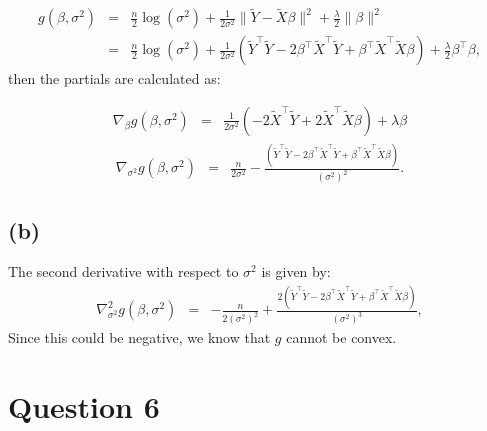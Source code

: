 \documentclass{article}\usepackage[]{graphicx}\usepackage[]{color}
\begin{document}
\begin{eqnarray*}
  g(\beta,\sigma^2) &=& \frac{n}{2}\log(\sigma^2) + \frac{1}{2\sigma^2}\|\tilde{Y}-\tilde{X}\beta\|^2 + \frac{\lambda}{2}\|\beta\|^2 \\
        &=& \frac{n}{2}\log(\sigma^2) + \frac{1}{2\sigma^2}(\tilde{Y}^\top\tilde{Y}-2\beta^\top\tilde{X}^\top\tilde{Y} + \beta^\top\tilde{X}^\top\tilde{X}\beta) + \frac{\lambda}{2}\beta^\top\beta,
\end{eqnarray*}
then the partials are calculated as:

\begin{eqnarray*}
  \nabla_\beta g(\beta,\sigma^2) &=& \frac{1}{2\sigma^2}\left( -2\tilde{X}^\top\tilde{Y} + 2\tilde{X}^\top\tilde{X}\beta \right) + \lambda\beta
\end{eqnarray*}
\begin{eqnarray*}
  \nabla_{\sigma^2} g(\beta,\sigma^2) &=& \frac{n}{2\sigma^2} - \frac{(\tilde{Y}^\top\tilde{Y} - 2\beta^\top\tilde{X}^\top\tilde{Y} + \beta^\top\tilde{X}^\top\tilde{X}\beta)}{(\sigma^2)^2}.
\end{eqnarray*}

\subsection*{(b)}
The second derivative with respect to $\sigma^2$ is given by:
\begin{eqnarray*}
  \nabla_{\sigma^2}^2 g(\beta,\sigma^2) &=& -\frac{n}{2(\sigma^2)^2} + \frac{2(\tilde{Y}^\top\tilde{Y} - 2\beta^\top\tilde{X}^\top\tilde{Y} + \beta^\top\tilde{X}^\top\tilde{X}\beta)}{(\sigma^2)^3},
\end{eqnarray*}
Since this could be negative, we know that $g$ cannot be convex.

\section*{Question 6}
\end{document}
